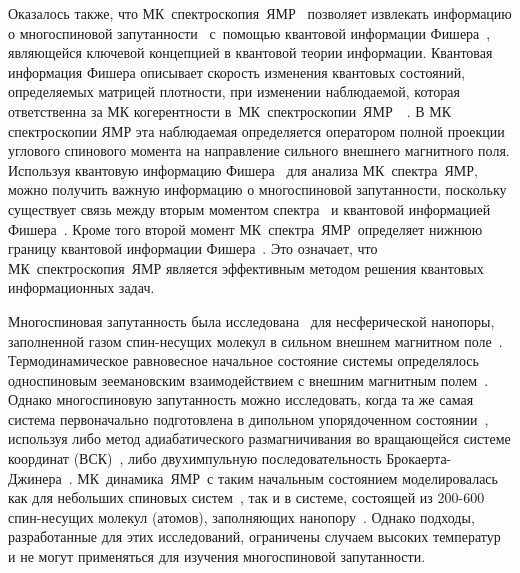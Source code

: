 \documentclass[utf8]{jetp}
\begin{document}
Оказалось также, что МК~спектроскопия~ЯМР~\cite{Baum_1985} позволяет извлекать информацию о многоспиновой запутанности~\cite{G_rttner_2018} с~помощью квантовой информации Фишера~\cite{T_th_2014, Pezz__2018},
являющейся ключевой концепцией в квантовой теории информации.
Квантовая информация Фишера описывает скорость изменения квантовых состояний,
определяемых матрицей плотности, при изменении наблюдаемой, которая
ответственна за МК когерентности  в~МК~спектроскопии~ЯМР~~\cite{Baum_1985}.
В МК спектроскопии ЯМР эта наблюдаемая определяется оператором полной проекции углового спинового момента на направление сильного внешнего магнитного поля.
Используя квантовую информацию Фишера~\cite{Liu_2014} для анализа МК~спектра~ЯМР,
можно получить важную информацию о многоспиновой запутанности,
поскольку существует связь между вторым моментом спектра~\cite{Khitrin_1997} и квантовой информацией Фишера~\cite{G_rttner_2018,Doronin_2019}.
Кроме того второй момент МК~спектра~ЯМР~определяет нижнюю границу квантовой информации Фишера~\cite{G_rttner_2018}.
Это означает, что МК~спектроскопия~ЯМР является эффективным методом решения квантовых информационных задач.

Многоспиновая запутанность была исследована~\cite{Doronin_2019} для несферической нанопоры,
заполненной газом  спин-несущих молекул в сильном внешнем магнитном поле~\cite{Baugh_2001,Doronin_2009}.
Термодинамическое равновесное начальное состояние системы определялось односпиновым зеемановским взаимодействием с внешним магнитным полем~\cite{Doronin_2007a}.
Однако  многоспиновую запутанность можно  исследовать,
когда та же самая система первоначально подготовлена в дипольном упорядоченном состоянии~\cite{Goldman_1970},
используя либо метод адиабатического размагничивания во вращающейся системе координат (ВСК)~\cite{Goldman_1970, Slichter_1961},
либо двухимпульную последовательность Брокаерта-Джинера~\cite{Goldman_1970, Jeener_1967}.
МК~динамика~ЯМР~с таким начальным состоянием моделировалась как для небольших спиновых систем~\cite{Doronin_2007a, Doronin_2007b},
так и в системе, состоящей из 200-600 спин-несущих молекул (атомов), заполняющих нанопору~\cite{Doronin_2011}.
Однако подходы, разработанные для этих исследований, ограничены случаем высоких температур и не могут применяться  для изучения многоспиновой запутанности.
\end{document}
